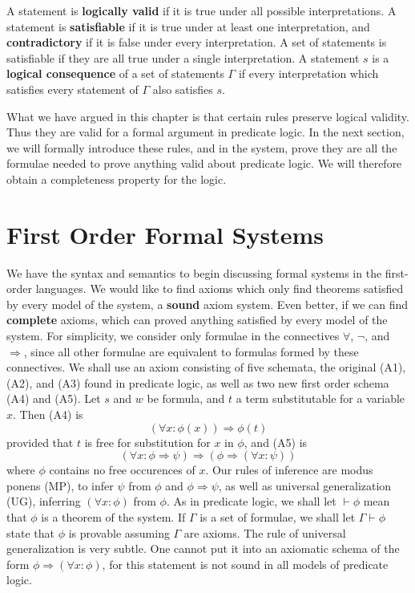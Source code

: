 A statement is {\bf logically valid} if it is true under all possible interpretations. A statement is {\bf satisfiable} if it is true under at least one interpretation, and {\bf contradictory} if it is false under every interpretation. A set of statements is satisfiable if they are all true under a single interpretation. A statement $s$ is a {\bf logical consequence} of a set of statements $\Gamma$ if every interpretation which satisfies every statement of $\Gamma$ also satisfies $s$.

What we have argued in this chapter is that certain rules preserve logical validity. Thus they are valid for a formal argument in predicate logic. In the next section, we will formally introduce these rules, and in the system, prove they are all the formulae needed to prove anything valid about predicate logic. We will therefore obtain a completeness property for the logic.






\section{First Order Formal Systems}

We have the syntax and semantics to begin discussing formal systems in the first-order languages. We would like to find axioms which only find theorems satisfied by every model of the system, a {\bf sound} axiom system. Even better, if we can find {\bf complete} axioms, which can proved anything satisfied by every model of the system. For simplicity, we consider only formulae in the connectives $\forall$, $\neg$, and $\Rightarrow$, since all other formulae are equivalent to formulas formed by these connectives. We shall use an axiom consisting of five schemata, the original (A1), (A2), and (A3) found in predicate logic, as well as two new first order schema (A4) and (A5). Let $s$ and $w$ be formula, and $t$ a term substitutable for a variable $x$. Then (A4) is
%
\[ (\forall x: \phi(x)) \Rightarrow \phi(t) \]
%
provided that $t$ is free for substitution for $x$ in $\phi$, and (A5) is
%
\[ (\forall x: \phi \Rightarrow \psi) \Rightarrow (\phi \Rightarrow (\forall x: \psi)) \]
%
where $\phi$ contains no free occurences of $x$. Our rules of inference are modus ponens (MP), to infer $\psi$ from $\phi$ and $\phi \Rightarrow \psi$, as well as universal generalization (UG), inferring $(\forall x: \phi)$ from $\phi$. As in predicate logic, we shall let $\vdash \phi$ mean that $\phi$ is a theorem of the system. If $\Gamma$ is a set of formulae, we shall let $\Gamma \vdash \phi$ state that $\phi$ is provable assuming $\Gamma$ are axioms. The rule of universal generalization is very subtle. One cannot put it into an axiomatic schema of the form $\phi \Rightarrow (\forall x: \phi)$, for this statement is not sound in all models of predicate logic.


